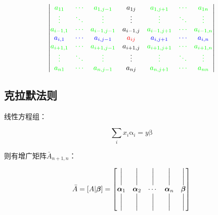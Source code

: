 \documentclass{article}
\begin{document}
\[\begin{vmatrix}
        \textcolor{green}{a_{11}}    & \textcolor{green}{\cdots} & \textcolor{green}{a_{1,j-1}}   & a_{1j}            & \textcolor{green}{a_{1,j+1}}   & \textcolor{green}{\cdots} & \textcolor{green}{a_{1n}}    \\
        \textcolor{green}{\vdots}    & \textcolor{green}{\ddots} & \textcolor{green}{\vdots}      & \vdots            & \textcolor{green}{\vdots}      & \textcolor{green}{\ddots} & \textcolor{green}{\vdots}    \\
        \textcolor{green}{a_{i-1,1}} & \textcolor{green}{\cdots} & \textcolor{green}{a_{i-1,j-1}} & a_{i-1,j}         & \textcolor{green}{a_{i-1,j+1}} & \textcolor{green}{\cdots} & \textcolor{green}{a_{i-1,n}} \\
        \textcolor{blue}{a_{i,1}}    & \textcolor{blue}{\cdots}  & \textcolor{blue}{a_{i,j-1}}    & \color{red}a_{ij} & \textcolor{blue}{a_{i,j+1}}    & \textcolor{blue}{\cdots}  & \textcolor{blue}{a_{i,n}}    \\
        \textcolor{green}{a_{i+1,1}} & \textcolor{green}{\cdots} & \textcolor{green}{a_{i+1,j-1}} & a_{i+1,j}         & \textcolor{green}{a_{i+1,j+1}} & \textcolor{green}{\cdots} & \textcolor{green}{a_{i+1,n}} \\
        \textcolor{green}{\vdots}    & \textcolor{green}{\ddots} & \textcolor{green}{\vdots}      & \vdots            & \textcolor{green}{\vdots}      & \textcolor{green}{\ddots} & \textcolor{green}{\vdots}    \\
        \textcolor{green}{a_{n1}}    & \textcolor{green}{\cdots} & \textcolor{green}{a_{n,j-1}}   & a_{nj}            & \textcolor{green}{a_{n,j+1}}   & \textcolor{green}{\cdots} & \textcolor{green}{a_{nn}}    \\
    \end{vmatrix}\]

\subsection{克拉默法则}

线性方程组：

\[\sum_ix_i{\boldsymbol{\mathrm\alpha}}_i=y{\boldsymbol{\mathrm\beta}}\]

则有增广矩阵$\bar A_{n+1,n}$：

\[\def\av{\boldsymbol{\mathrm\alpha}}
    \bar A=
    \left[A|\boldsymbol{\mathrm\beta}\right]=
    \begin{bmatrix}
        \bigg| & \bigg| & \bigg| & \bigg| & \bigg|                    \\
        \av_1  & \av_2  & \cdots & \av_n  & \boldsymbol{\mathrm\beta} \\
        \bigg| & \bigg| & \bigg| & \bigg| & \bigg|
    \end{bmatrix}\]
\end{document}
